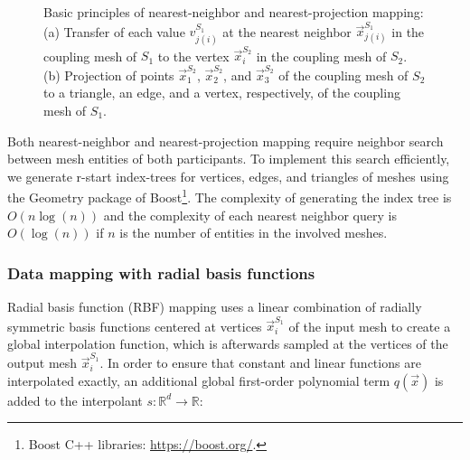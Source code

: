 \begin{figure}[h!]
{
  }
  \caption{\label{fig:nn_np}Basic principles of nearest-neighbor and nearest-projection mapping: (a) Transfer of each value $v_{j(i)}^{S_1}$ at the nearest neighbor $\vec{x}_{j(i)}^{S_1}$ in the coupling mesh of $S_1$ to the vertex $\vec{x}_i^{S_2}$ in the coupling mesh of $S_2$. (b) Projection of points $\vec{x}_1^{S_2}$, $\vec{x}_2^{S_2}$, and $\vec{x}_3^{S_2}$ of the coupling mesh of $S_2$ to a triangle, an edge, and a vertex, respectively, of the coupling mesh of $S_1$.}
\end{figure}  

Both nearest-neighbor and nearest-projection mapping require neighbor search between mesh entities of both participants. 
To implement this search efficiently, we generate r-start index-trees for vertices, edges, and triangles of meshes using the Geometry package of Boost\footnote{Boost C++ libraries: \url{https://boost.org/}.}.
The complexity of generating the index tree is $O(n \log(n))$ and the complexity of each nearest neighbor query is $O(\log(n))$ if $n$ is the number of entities in the involved meshes. 

\subsubsection{Data mapping with radial basis functions}

Radial basis function (RBF) mapping uses a linear combination of radially symmetric basis functions centered at vertices $\vec{x}^{S_1}_{i}$ of the input mesh to create a global interpolation function, which is afterwards sampled at the vertices of the output mesh $\vec{x}^{S_1}_{i}$. In order to ensure that constant and linear functions are interpolated exactly, an additional global first-order polynomial term $q(\vec{x})$ is added to the interpolant $s : \mathbb{R}^{d} \rightarrow \mathbb{R}$:

